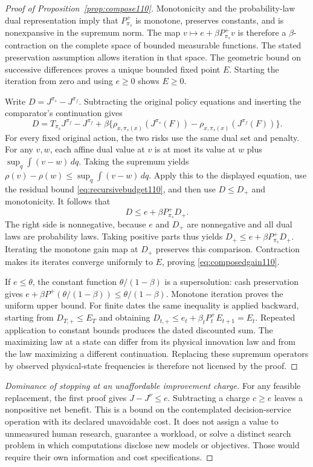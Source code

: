 \begin{proof}[Proof of Proposition~\ref{prop:compose110}]
Monotonicity and the probability-law dual representation imply that $P^+_{\pi_s}$ is monotone, preserves constants, and is nonexpansive in the supremum norm. The map $v\mapsto e+\beta P^+_{\pi_s}v$ is therefore a $\beta$-contraction on the complete space of bounded measurable functions. The stated preservation assumption allows iteration in that space. The geometric bound on successive differences proves a unique bounded fixed point $E$. Starting the iteration from zero and using $e\ge0$ shows $E\ge0$.

Write $D=J^{\pi_s}-J^{\pi_f}$. Subtracting the original policy equations and inserting the comparator's continuation gives
\[
 D=T_{\pi_s}J^{\pi_f}-J^{\pi_f}
    +\beta\{\rho_{x,\pi_s(x)}(J^{\pi_s}(F))
                 -\rho_{x,\pi_s(x)}(J^{\pi_f}(F))\}.
\]
For every fixed original action, the two risks use the same dual set and penalty. For any $v,w$, each affine dual value at $v$ is at most its value at $w$ plus $\sup_q\int(v-w)\,dq$. Taking the supremum yields
$\rho(v)-\rho(w)\le\sup_q\int(v-w)\,dq$. Apply this to the displayed equation, use the residual bound \eqref{eq:recursivebudget110}, and then use $D\le D_+$ and monotonicity. It follows that
\[
 D\le e+\beta P^+_{\pi_s}D_+.
\]
The right side is nonnegative, because $e$ and $D_+$ are nonnegative and all dual laws are probability laws. Taking positive parts thus yields
$D_+\le e+\beta P^+_{\pi_s}D_+$. Iterating the monotone gain map at $D_+$ preserves this comparison. Contraction makes its iterates converge uniformly to $E$, proving \eqref{eq:composedgain110}.

If $e\le\theta$, the constant function $\theta/(1-\beta)$ is a supersolution: cash preservation gives $e+\beta P^+(\theta/(1-\beta))\le\theta/(1-\beta)$. Monotone iteration proves the uniform upper bound. For finite dates the same inequality is applied backward, starting from $D_{T,+}\le E_T$ and obtaining $D_{t,+}\le e_t+\beta_tP^+_tE_{t+1}=E_t$. Repeated application to constant bounds produces the dated discounted sum. The maximizing law at a state can differ from its physical innovation law and from the law maximizing a different continuation. Replacing these supremum operators by observed physical-state frequencies is therefore not licensed by the proof.
\end{proof}

\begin{proof}[Dominance of stopping at an unaffordable improvement charge]
For any feasible replacement, the first proof gives $J-J^\nu\le e$. Subtracting a charge $c\ge e$ leaves a nonpositive net benefit. This is a bound on the contemplated decision-service operation with its declared unavoidable cost. It does not assign a value to unmeasured human research, guarantee a workload, or solve a distinct search problem in which computations disclose new models or objectives. Those would require their own information and cost specifications.
\end{proof}
